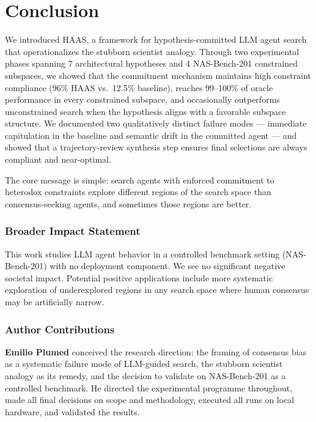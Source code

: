 \documentclass[10pt]{article}
\newcommand{\haas}{\textsc{HAAS}}
\newcommand{\nasbench}{NAS-Bench-201}
\begin{document}
\section{Conclusion}
\label{sec:conclusion}

We introduced \haas{}, a framework for hypothesis-committed LLM agent search
that operationalizes the stubborn scientist analogy. Through two experimental
phases spanning 7 architectural hypotheses and 4 \nasbench{} constrained
subspaces, we showed that the commitment mechanism maintains high constraint
compliance (96\% \haas{} vs.\ 12.5\% baseline), reaches 99--100\% of oracle
performance in every constrained subspace, and occasionally outperforms
unconstrained search when the hypothesis aligns with a favorable subspace
structure. We documented two qualitatively distinct failure modes --- immediate capitulation
in the baseline and semantic drift in the committed agent --- and showed that
a trajectory-review synthesis step ensures final selections are always compliant
and near-optimal.

The core message is simple: search agents with enforced commitment to heterodox
constraints explore different regions of the search space than consensus-seeking
agents, and sometimes those regions are better.

\subsubsection*{Broader Impact Statement}

This work studies LLM agent behavior in a controlled benchmark setting (NAS-Bench-201)
with no deployment component. We see no significant negative societal impact.
Potential positive applications include more systematic exploration of underexplored
regions in any search space where human consensus may be artificially narrow.

\subsubsection*{Author Contributions}

\textbf{Emilio Plumed} conceived the research direction: the framing of consensus
bias as a systematic failure mode of LLM-guided search, the stubborn scientist
analogy as its remedy, and the decision to validate on NAS-Bench-201 as a
controlled benchmark. He directed the experimental programme throughout, made
all final decisions on scope and methodology, executed all runs on local
hardware, and validated the results.
\end{document}
